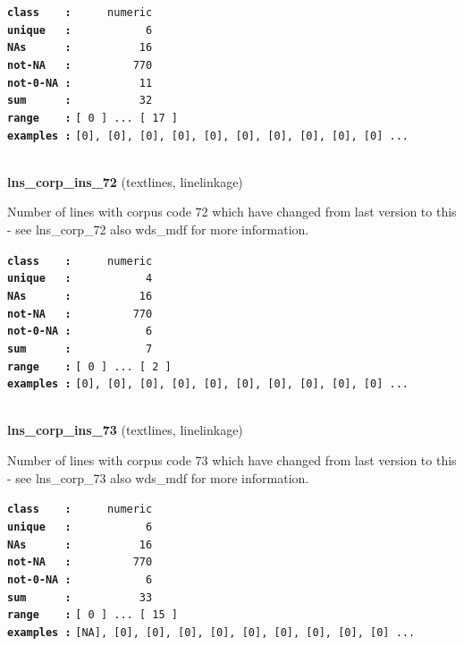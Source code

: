 \documentclass[]{article}
\begin{document}
\textbf{\texttt{class\ \ \ \ :}} \texttt{~~~~~numeric}\\
\textbf{\texttt{unique\ \ \ :}} \texttt{~~~~~~~~~~~6}\\
\textbf{\texttt{NAs\ \ \ \ \ \ :}} \texttt{~~~~~~~~~~16}\\
\textbf{\texttt{not-NA\ \ \ :}} \texttt{~~~~~~~~~770}\\
\textbf{\texttt{not-0-NA\ :}} \texttt{~~~~~~~~~~11}\\
\textbf{\texttt{sum\ \ \ \ \ \ :}} \texttt{~~~~~~~~~~32}\\
\textbf{\texttt{range\ \ \ \ :}}
\texttt{{[}\ 0\ {]}\ ...\ {[}\ 17\ {]}}\\
\textbf{\texttt{examples\ :}}
\texttt{{[}0{]},\ {[}0{]},\ {[}0{]},\ {[}0{]},\ {[}0{]},\ {[}0{]},\ {[}0{]},\ {[}0{]},\ {[}0{]},\ {[}0{]}\ ...}\\

~

\textbf{lns\_corp\_ins\_72} (textlines, linelinkage)

Number of lines with corpus code 72 which have changed from last version
to this - see lns\_corp\_72 also wds\_mdf for more information.

\textbf{\texttt{class\ \ \ \ :}} \texttt{~~~~~numeric}\\
\textbf{\texttt{unique\ \ \ :}} \texttt{~~~~~~~~~~~4}\\
\textbf{\texttt{NAs\ \ \ \ \ \ :}} \texttt{~~~~~~~~~~16}\\
\textbf{\texttt{not-NA\ \ \ :}} \texttt{~~~~~~~~~770}\\
\textbf{\texttt{not-0-NA\ :}} \texttt{~~~~~~~~~~~6}\\
\textbf{\texttt{sum\ \ \ \ \ \ :}} \texttt{~~~~~~~~~~~7}\\
\textbf{\texttt{range\ \ \ \ :}}
\texttt{{[}\ 0\ {]}\ ...\ {[}\ 2\ {]}}\\
\textbf{\texttt{examples\ :}}
\texttt{{[}0{]},\ {[}0{]},\ {[}0{]},\ {[}0{]},\ {[}0{]},\ {[}0{]},\ {[}0{]},\ {[}0{]},\ {[}0{]},\ {[}0{]}\ ...}\\

~

\textbf{lns\_corp\_ins\_73} (textlines, linelinkage)

Number of lines with corpus code 73 which have changed from last version
to this - see lns\_corp\_73 also wds\_mdf for more information.

\textbf{\texttt{class\ \ \ \ :}} \texttt{~~~~~numeric}\\
\textbf{\texttt{unique\ \ \ :}} \texttt{~~~~~~~~~~~6}\\
\textbf{\texttt{NAs\ \ \ \ \ \ :}} \texttt{~~~~~~~~~~16}\\
\textbf{\texttt{not-NA\ \ \ :}} \texttt{~~~~~~~~~770}\\
\textbf{\texttt{not-0-NA\ :}} \texttt{~~~~~~~~~~~6}\\
\textbf{\texttt{sum\ \ \ \ \ \ :}} \texttt{~~~~~~~~~~33}\\
\textbf{\texttt{range\ \ \ \ :}}
\texttt{{[}\ 0\ {]}\ ...\ {[}\ 15\ {]}}\\
\textbf{\texttt{examples\ :}}
\texttt{{[}NA{]},\ {[}0{]},\ {[}0{]},\ {[}0{]},\ {[}0{]},\ {[}0{]},\ {[}0{]},\ {[}0{]},\ {[}0{]},\ {[}0{]}\ ...}\\
\end{document}
